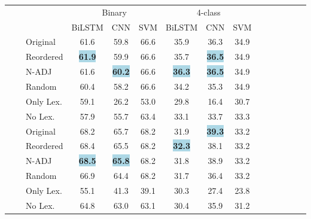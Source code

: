 \documentclass[11pt,a4paper]{article}
\newcommand{\rt}[1]{\rotatebox{90}{#1}}
\begin{document}
\begin{table}
\newcommand{\sep}{\cmidrule(r){4-6}\cmidrule(r){7-9}}
\newcommand{\sepp}{\cmidrule(r){4-4}\cmidrule(r){5-5}\cmidrule(r){6-6}\cmidrule(r){7-7}\cmidrule(r){8-8}\cmidrule(r){9-9}}


\newcommand{\bestproj}[1]{{\setlength{\fboxsep}{0pt}\colorbox{lightblue}{\textbf{#1}}}}
\newcommand{\bestmono}[1]{{\setlength{\fboxsep}{0pt}\colorbox{lightgreen}{\textbf{#1}}}}
\newcommand{\bestmt}[1]{{\setlength{\fboxsep}{0pt}\colorbox{pink}{\textbf{#1}}}}

\setlength\tabcolsep{4pt}
\renewcommand*{\arraystretch}{0.5}
\centering\tiny
\begin{tabular}{lllcccccccccccc}
\toprule
&& & \multicolumn{3}{c}{Binary} & \multicolumn{3}{c}{4-class} \\
\sep
\multirow{16}{*}{\rt{Bilingual Word Embeddings}} 
	    &&& BiLSTM & CNN & SVM & BiLSTM & CNN & SVM \\
	    \cmidrule(r){4-4}\cmidrule(r){5-5}\cmidrule(r){6-6}\cmidrule(r){7-7}\cmidrule(r){8-8}\cmidrule(r){9-9}
	& \multirow{6}{*}{\rt{EN-ES}}
		& Original 	 & 61.6 & 59.8 & 66.6 & 35.9 & 36.3 & 34.9 \\ 
		&& Reordered  & \bestproj{61.9} & 59.9 & 66.6 & 35.7 & \bestproj{36.5} & 34.9 \\ 
		&& N-ADJ  & 61.6 & \bestproj{60.2} & 66.6 & \bestproj{36.3} & \bestproj{36.5} & 34.9 \\ 
		&& Random  & 60.4 & 58.2 & 66.6 & 34.2 & 35.3 & 34.9 \\ 
		&& Only Lex.  & 59.1 & 26.2 & 53.0 & 29.8 & 16.4 & 30.7 \\ 
		&& No Lex.  & 57.9 & 55.7 & 63.4 & 33.1 & 33.7 & 33.3 \\ 
	\sepp
	& \multirow{6}{*}{\rt{EN-CA}}
  		& Original & 68.2 & 65.7 & 68.2 & 31.9 & \bestproj{39.3} & 33.2 \\ 
		&& Reordered  & 68.4 & 65.5 & 68.2 & \bestproj{32.3} & 38.1 & 33.2 \\ 
		&& N-ADJ &  \bestproj{68.5} & \bestproj{65.8} & 68.2 & 31.8 & 38.9 & 33.2 \\ 
		&& Random & 66.9 & 64.4 & 68.2 & 31.7 & 36.4 & 33.2 \\ 
		&& Only Lex.  & 55.1 & 41.3 & 39.1 & 30.3 & 27.4 & 23.8 \\ 
		&& No Lex. & 64.8 & 63.0 & 63.1 & 30.4 & 35.9 & 31.2 \\ 




\end{tabular}
\end{table}
\end{document}

